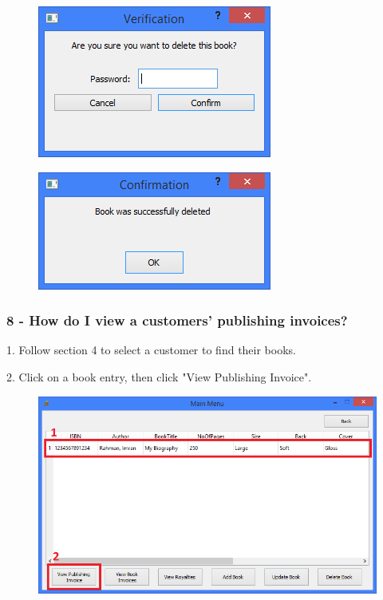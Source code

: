 \begin{figure}[H]
    \includegraphics[width=\textwidth]{./Manual/Tutorial/Q7/Verification.png}
\end{figure}

\begin{figure}[H]
    \includegraphics[width=\textwidth]{./Manual/Tutorial/Q7/Deleted.png}
\end{figure}

\subsubsection{8 -  How do I view a customers' publishing invoices?} \label{sssec:Q8}

1. Follow section 4 to select a customer to find their books.

2. Click on a book entry, then click "View Publishing Invoice".

\begin{figure}[H]
    \includegraphics[width=\textwidth]{./Manual/Tutorial/Q8/ViewPubInvoice.png}
\end{figure}

